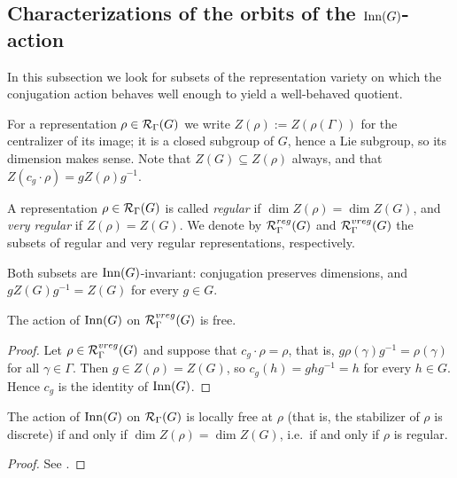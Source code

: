 \subsection{Characterizations of the orbits of the $\operatorname{Inn}(G)$-action}

In this subsection we look for subsets of the representation variety on which the conjugation action behaves well enough to yield a well-behaved quotient.

For a representation $\rho \in \RepVar{\Gamma}{G}$ we write $Z(\rho) := Z(\rho(\Gamma))$ for the centralizer of its image; it is a closed subgroup of $G$, hence a Lie subgroup, so its dimension makes sense. Note that $Z(G) \subseteq Z(\rho)$ always, and that $Z(c_g \cdot \rho) = g Z(\rho) g^{-1}$.

\begin{definition}
    A representation $\rho \in \RepVar{\Gamma}{G}$ is called \emph{regular} if $\dim Z(\rho) = \dim Z(G)$, and \emph{very regular} if $Z(\rho) = Z(G)$. We denote by $\RepVar{\Gamma}{G}[reg]$ and $\RepVar{\Gamma}{G}[vreg]$ the subsets of regular and very regular representations, respectively.
\end{definition}

Both subsets are $\operatorname{Inn}(G)$-invariant: conjugation preserves dimensions, and $g Z(G) g^{-1} = Z(G)$ for every $g \in G$.

\begin{lemma}\label{lem:free-action}
    The action of $\operatorname{Inn}(G)$ on $\RepVar{\Gamma}{G}[vreg]$ is free.
\end{lemma}

\begin{proof}
    Let $\rho \in \RepVar{\Gamma}{G}[vreg]$ and suppose that $c_g \cdot \rho = \rho$, that is, $g \rho(\gamma) g^{-1} = \rho(\gamma)$ for all $\gamma \in \Gamma$. Then $g \in Z(\rho) = Z(G)$, so $c_g(h) = ghg^{-1} = h$ for every $h \in G$. Hence $c_g$ is the identity of $\operatorname{Inn}(G)$.
\end{proof}

\begin{proposition}\label{prop:locally-free}
    The action of $\operatorname{Inn}(G)$ on $\RepVar{\Gamma}{G}$ is locally free at $\rho$ (that is, the stabilizer of $\rho$ is discrete) if and only if $\dim Z(\rho) = \dim Z(G)$, i.e.\ if and only if $\rho$ is regular.
\end{proposition}

\begin{proof}
    See \cite[Prop.~8]{casimiroCharacterVarietiesTheir2026}.
\end{proof}

